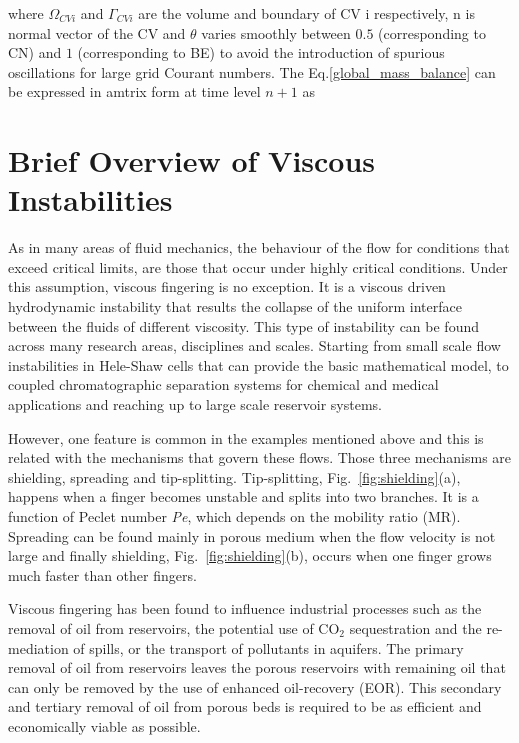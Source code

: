 \documentclass[preprint,authoryear,12pt]{elsarticle}
\begin{document}
where $\Omega_{CVi}$ and $\Gamma_{CVi}$ are the volume and boundary of CV i respectively, n is normal vector of the CV and $\theta$ varies smoothly between $0.5$ (corresponding to CN) and $1$ (corresponding to BE) to avoid the introduction of spurious oscillations for large grid Courant numbers. The Eq.\ref{global_mass_balance} can be expressed in amtrix form at time level $n+1$ as
   


\section{Brief Overview of Viscous Instabilities}\label{section:ViscousInstabilities}
As in many areas of fluid mechanics, the behaviour of the flow for conditions that exceed critical limits, are those that occur under highly critical conditions. Under this assumption, viscous fingering is no exception. It is a viscous driven hydrodynamic instability that results the collapse of the uniform interface between the fluids of different viscosity. This type of instability can be found across many research areas, disciplines and scales. Starting from small scale flow instabilities in Hele-Shaw cells that can provide the basic mathematical model, to coupled chromatographic separation systems for chemical and medical applications and reaching up to large scale reservoir systems.

However, one feature is common in the examples mentioned above and this is related with the mechanisms that govern these flows. Those three mechanisms are shielding, spreading and tip-splitting. Tip-splitting, Fig.~\ref{fig:shielding}(a), happens when a finger becomes unstable and splits into two branches. It is a function of Peclet number \textit{Pe}, which depends on the mobility ratio (MR). Spreading can be found mainly in porous medium when the flow velocity is not large and finally shielding, Fig.~\ref{fig:shielding}(b), occurs when one finger grows much faster than other fingers.


Viscous fingering has been found to influence industrial processes such as the removal of oil from reservoirs, the potential use of CO$_2$ sequestration and the re-mediation of spills, or the transport of pollutants in aquifers. The primary removal of oil from reservoirs leaves the porous reservoirs with remaining oil that can only be removed by the use of enhanced oil-recovery (EOR). This secondary and tertiary removal of oil from porous beds is required to be as efficient and economically viable as possible.
 
\end{document}
